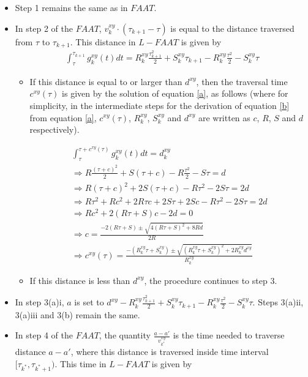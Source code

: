 \documentclass[conference]{IEEEtran}
\begin{document}
\begin{itemize}
    \item Step 1 remains the same as in $FAAT$.
    \item In step 2 of the $FAAT$, $v_k^{xy}\cdot(\tau_{k+1}-\tau)$ is equal to the distance traversed from $\tau$ to $\tau_{k+1}$. This distance in $L-FAAT$ is given by     
    \begin{eqnarray}
        &\int_{\tau}^{\tau_{k+1}}g_k^{xy}(t)dt=
        R_k^{xy}\frac{\tau_{k+1}^2}{2}+S_k^{xy}\tau_{k+1}-R_k^{xy}\frac{\tau^2}{2}-S_k^{xy}\tau &
    \end{eqnarray}

    \begin{itemize}
        \item If this distance is equal to or larger than $d^{xy}$, then the traversal time $c^{xy}(\tau)$ is given by the solution of equation \ref{a}, as follows (where for simplicity, in the intermediate steps for the derivation of equation \ref{b} from equation \ref{a}, $c^{xy}(\tau)$, $R_k^{xy}$, $S_k^{xy}$ and $d^{xy}$ are written as $c$, $R$, $S$ and $d$ respectively).

\begin{eqnarray}
&\int_{\tau}^{\tau+c^{xy}(\tau)}g_k^{xy}(t)dt=d_k^{xy}& \label{a} \\
&\Rightarrow R\frac{(\tau+c)^2}{2}+S(\tau+c)-R\frac{\tau^2}{2}-S\tau= d& \nonumber\\
&\Rightarrow R(\tau+c)^2+2S(\tau+c)-R\tau^2-2S\tau=2d& \nonumber\\
&\Rightarrow R\tau^2+Rc^2+2R\tau c+2S\tau+2Sc-R\tau^2-2S\tau=2d& \nonumber\\
&\Rightarrow Rc^2+2(R\tau+S)c-2d=0& \nonumber\\
&\Rightarrow c=\frac{-2(R\tau+S)\pm\sqrt{4(R\tau+S)^2+8Rd}}{2R}& \nonumber\\
&\Rightarrow c^{xy}(\tau)=\frac{-(R_k^{xy}\tau+S_k^{xy})\pm\sqrt{(R_k^{xy}\tau+S_k^{xy})^2+2R_k^{xy}d^{xy}}}{R_k^{xy}}& \label{b}
\end{eqnarray}

        \item If this distance is less than $d^{xy}$, the procedure continues to step 3.
    \end{itemize}
    \item In step 3(a)i, $a$ is set to $d^{xy}-R_k^{xy}\frac{\tau_{k+1}^2}{2}+S_k^{xy}\tau_{k+1}-R_k^{xy}\frac{\tau^2}{2}-S_k^{xy}\tau$. Steps 3(a)ii, 3(a)iii and 3(b) remain the same.
    \item In step 4 of the $FAAT$, the quantity  $\frac{a-a'}{v_{k^*}^{xy}}$ is the time needed to traverse distance $a-a'$, where this distance is traversed inside time interval $[\tau_{k^*}, \tau_{k^*+1})$. This time in $L-FAAT$ is given by 


\end{itemize}
\end{document}

